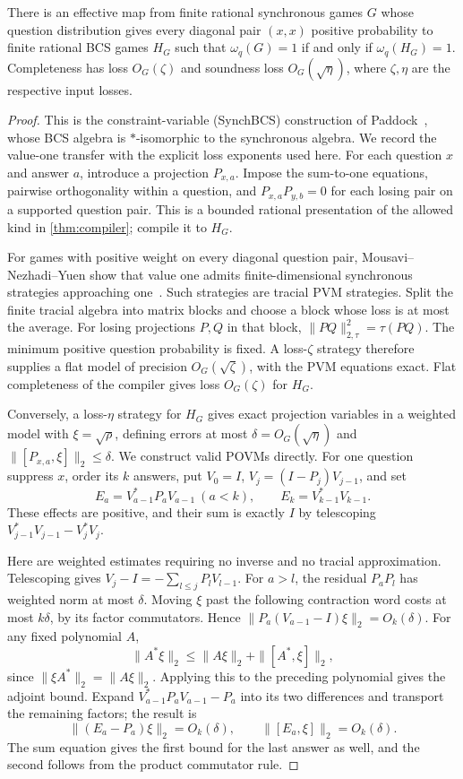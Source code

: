 \begin{lemma}\label{lem:synchronous-bcs-value}
There is an effective map from finite rational synchronous games $G$ whose question distribution gives every diagonal pair $(x,x)$ positive probability to finite rational BCS games $H_G$ such that $\omega_q(G)=1$ if and only if $\omega_q(H_G)=1$. Completeness has loss $O_G(\zeta)$ and soundness loss $O_G(\sqrt\eta)$, where $\zeta,\eta$ are the respective input losses.
\end{lemma}
\begin{proof}
This is the constraint-variable (SynchBCS) construction of Paddock~\cite[Section~4.3 and Proposition~4.22]{Pad22}, whose BCS algebra is $*$-isomorphic to the synchronous algebra. We record the value-one transfer with the explicit loss exponents used here.
For each question $x$ and answer $a$, introduce a projection $P_{x,a}$. Impose the sum-to-one equations, pairwise orthogonality within a question, and $P_{x,a}P_{y,b}=0$ for each losing pair on a supported question pair. This is a bounded rational presentation of the allowed kind in \cref{thm:compiler}; compile it to $H_G$.

For games with positive weight on every diagonal question pair, Mousavi--Nezhadi--Yuen show that value one admits finite-dimensional synchronous strategies approaching one~\cite[Theorem~1.6]{MNY22}. Such strategies are tracial PVM strategies. Split the finite tracial algebra into matrix blocks and choose a block whose loss is at most the average. For losing projections $P,Q$ in that block, $\|PQ\|_{2,\tau}^2=\tau(PQ)$. The minimum positive question probability is fixed. A loss-$\zeta$ strategy therefore supplies a flat model of precision $O_G(\sqrt\zeta)$, with the PVM equations exact. Flat completeness of the compiler gives loss $O_G(\zeta)$ for $H_G$.

Conversely, a loss-$\eta$ strategy for $H_G$ gives exact projection variables in a weighted model with $\xi=\sqrt\rho$, defining errors at most $\delta=O_G(\sqrt\eta)$ and $\|[P_{x,a},\xi]\|_2\le\delta$. We construct valid POVMs directly. For one question suppress $x$, order its $k$ answers, put $V_0=I$, $V_j=(I-P_j)V_{j-1}$, and set
\[
 E_a=V_{a-1}^*P_aV_{a-1}\ (a<k),\qquad E_k=V_{k-1}^*V_{k-1}.
\]
These effects are positive, and their sum is exactly $I$ by telescoping $V_{j-1}^*V_{j-1}-V_j^*V_j$.

Here are weighted estimates requiring no inverse and no tracial approximation. Telescoping gives $V_j-I=-\sum_{l\le j}P_lV_{l-1}$. For $a>l$, the residual $P_aP_l$ has weighted norm at most $\delta$. Moving $\xi$ past the following contraction word costs at most $k\delta$, by its factor commutators. Hence $\|P_a(V_{a-1}-I)\xi\|_2=O_k(\delta)$. For any fixed polynomial $A$,
\[
 \|A^*\xi\|_2\le\|A\xi\|_2+\|[A^*,\xi]\|_2,
\]
since $\|\xi A^*\|_2=\|A\xi\|_2$. Applying this to the preceding polynomial gives the adjoint bound. Expand $V_{a-1}^*P_aV_{a-1}-P_a$ into its two differences and transport the remaining factors; the result is
\[
 \|(E_a-P_a)\xi\|_2=O_k(\delta),\qquad
 \|[E_a,\xi]\|_2=O_k(\delta).
\]
The sum equation gives the first bound for the last answer as well, and the second follows from the product commutator rule.


\end{proof}
